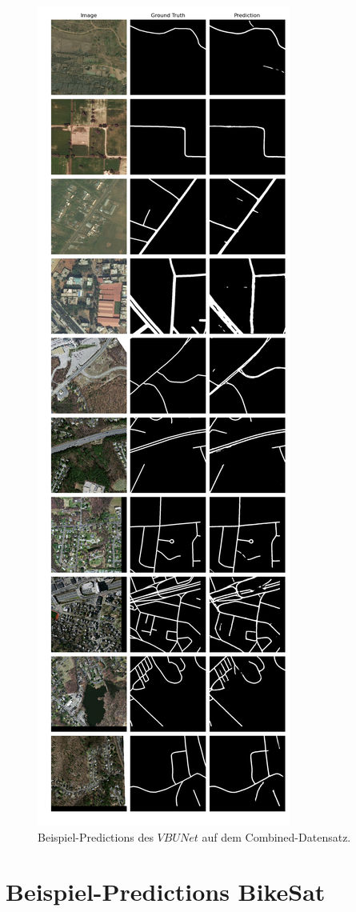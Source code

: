 \begin{figure}
	\centering
	\includegraphics[width=.41\textwidth]{Bilder/Samples-Combined/vbunet.png}
	\caption{Beispiel-Predictions des $VBUNet$ auf dem Combined-Datensatz.}
	\label{fig:combined-samples-vbunet}
\end{figure}

\pagebreak 



\section{Beispiel-Predictions BikeSat}

